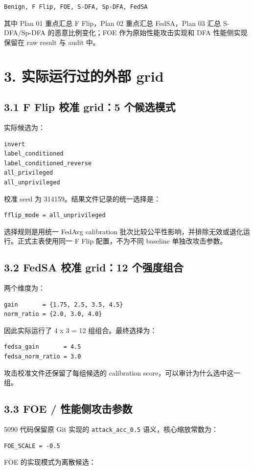 \documentclass[UTF8,a4paper,10pt]{ctexart}
\begin{document}
\begin{lstlisting}
Benign, F Flip, FOE, S-DFA, Sp-DFA, FedSA
\end{lstlisting}
其中 Plan 01 重点汇总 F Flip，Plan 02 重点汇总 FedSA，Plan 03 汇总 S-DFA/Sp-DFA 的恶意比例变化；FOE 作为原始性能攻击实现和 DFA 性能侧实现保留在 raw result 与 audit 中。

\section{3. 实际运行过的外部 grid}
\subsection{3.1 F Flip 校准 grid：5 个候选模式}
实际候选为：

\begin{lstlisting}
invert
label_conditioned
label_conditioned_reverse
all_privileged
all_unprivileged
\end{lstlisting}
校准 seed 为 314159。结果文件记录的统一选择是：

\begin{lstlisting}
fflip_mode = all_unprivileged
\end{lstlisting}
选择规则是用统一 FedAvg calibration 批次比较公平性影响，并排除无效或退化运行。正式主表使用同一 F Flip 配置，不为不同 baseline 单独改攻击参数。

\subsection{3.2 FedSA 校准 grid：12 个强度组合}
两个维度为：

\begin{lstlisting}
gain       = {1.75, 2.5, 3.5, 4.5}
norm_ratio = {2.0, 3.0, 4.0}
\end{lstlisting}
因此实际运行了 4 x 3 = 12 组组合。最终选择为：

\begin{lstlisting}
fedsa_gain       = 4.5
fedsa_norm_ratio = 3.0
\end{lstlisting}
攻击校准文件还保留了每组候选的 calibration score，可以审计为什么选中这一组。

\subsection{3.3 FOE / 性能侧攻击参数}
5090 代码保留原 Git 实现的 \texttt{attack\_acc\_0.5} 语义，核心缩放常数为：

\begin{lstlisting}
FOE_SCALE = -0.5
\end{lstlisting}
FOE 的实现模式为离散候选：
\end{document}
